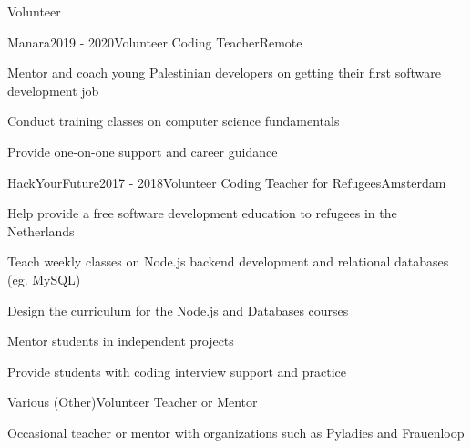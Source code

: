 \documentclass{resume} %
\begin{document}
\newpage


\begin{rSection}{Volunteer}

    \begin{rSubsection}{{Manara}}{2019 - 2020}{Volunteer Coding Teacher}{Remote}
        \item Mentor and coach young Palestinian developers on getting their first software development job
        \item Conduct training classes on computer science fundamentals
        \item Provide one-on-one support and career guidance
    \end{rSubsection}


    \begin{rSubsection}{{HackYourFuture}}{2017 - 2018}{Volunteer Coding Teacher for Refugees}{Amsterdam}
        \item Help provide a free software development education to refugees in the Netherlands
        \item Teach weekly classes on Node.js backend development and relational databases (eg. MySQL)
        \item Design the curriculum for the Node.js and Databases courses
        \item Mentor students in independent projects
        \item Provide students with coding interview support and practice
    \end{rSubsection}

    \begin{rSubsection}{{Various (Other)}}{}{Volunteer Teacher or Mentor}{}
        \item Occasional teacher or mentor with organizations such as Pyladies and Frauenloop
    \end{rSubsection}


\end{rSection}

\end{document}
